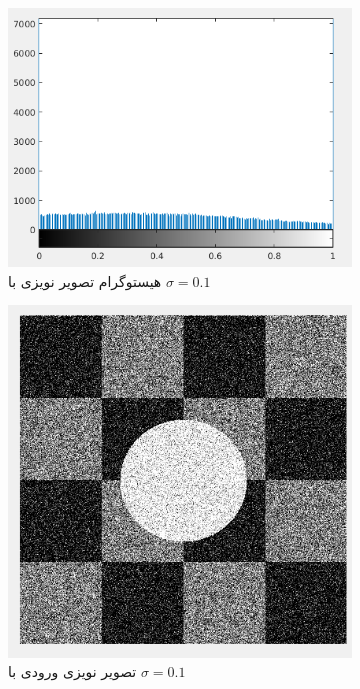 \documentclass[11.5pt,a4paper]{article}
\begin{document}
\begin{figure}[h]
\center
	\begin{subfigure}{0.3\textwidth}
	\includegraphics[scale=0.3]{Imgs/MRF_S1_Hist.png}
	\caption{هیستوگرام تصویر نویزی با $\sigma=0.1$}
	\end{subfigure}
	\begin{subfigure}{0.3\textwidth}
	\includegraphics[scale=0.3]{Imgs/MRF_S1_In.png}
	\caption{تصویر نویزی ورودی با $\sigma=0.1$}
	\end{subfigure}
	\begin{subfigure}{0.3\textwidth}

\end{subfigure}
\end{figure}
\end{document}
